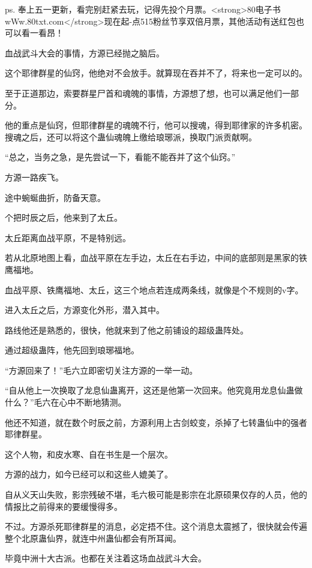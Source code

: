 
\begin{this_body}

ps. 奉上五一更新，看完别赶紧去玩，记得先投个月票。<strong>80电子书wWw.80txt.com</strong>现在起-点515粉丝节享双倍月票，其他活动有送红包也可以看一看昂！

血战武斗大会的事情，方源已经抛之脑后。

这个耶律群星的仙窍，他绝对不会放手。就算现在吞并不了，将来也一定可以的。

至于正道那边，索要群星尸首和魂魄的事情，方源想了想，也可以满足他们一部分。

他的重点是仙窍，但耶律群星的魂魄不行，他可以搜魂，得到耶律家的许多机密。搜魂之后，还可以将这个蛊仙魂魄上缴给琅琊派，换取门派贡献啊。

“总之，当务之急，是先尝试一下，看能不能吞并了这个仙窍。”

方源一路疾飞。

途中蜿蜒曲折，防备天意。

个把时辰之后，他来到了太丘。

太丘距离血战平原，不是特别远。

若从北原地图上看，血战平原在左手边，太丘在右手边，中间的底部则是黑家的铁鹰福地。

血战平原、铁鹰福地、太丘，这三个地点若连成两条线，就像是个不规则的v字。

进入太丘之后，方源变化外形，潜入其中。

路线他还是熟悉的，很快，他就来到了他之前铺设的超级蛊阵处。

通过超级蛊阵，他先回到琅琊福地。

“方源回来了！”毛六立即密切关注方源的一举一动。

“自从他上一次换取了龙息仙蛊离开，这还是他第一次回来。他究竟用龙息仙蛊做什么？”毛六在心中不断地猜测。

他还不知道，就在数个时辰之前，方源利用上古剑蛟变，杀掉了七转蛊仙中的强者耶律群星。

这个人物，和皮水寒、自在书生是一个层次。

方源的战力，如今已经可以和这些人媲美了。

自从义天山失败，影宗残破不堪，毛六极可能是影宗在北原硕果仅存的人员，他的情报比之前得来的要缓慢得多。

不过。方源杀死耶律群星的消息，必定捂不住。这个消息太震撼了，很快就会传遍整个北原蛊仙界，就连中州蛊仙都会有所耳闻。

毕竟中洲十大古派。也都在关注着这场血战武斗大会。


\end{this_body}
